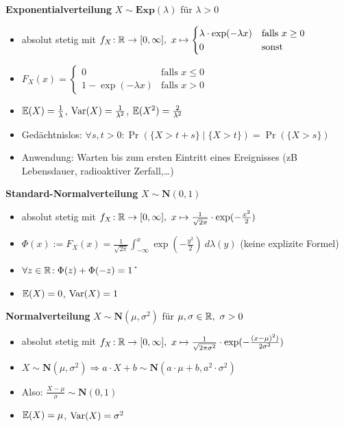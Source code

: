 \textbf{Exponentialverteilung} $X\sim\mathbf{Exp}(\lambda)$ für $\lambda > 0$
\begin{itemize}
\item absolut stetig mit
  $f_X\!: \mathbb{R} \to [0,\infty],\ x \mapsto \begin{cases}
  \lambda \cdot \exp(-\lambda x) & \text{falls } x \geq 0	\\
  0                              & \text{sonst }
  \end{cases}$

\item
  $F_X(x) = \begin{cases}
  0                    & \text{falls } x \leq 0  \\
  1 - \exp(-\lambda x) & \text{falls } x > 0
  \end{cases}$

\item $\mathbb{E}(X) = \frac{1}{\lambda}$, $\operatorname{Var}(X) = \frac{1}{\lambda^2}$,
  $\mathbb{E}(X^2) = \frac{2}{\lambda^2}$

\item Gedächtnislos: $\forall s,t>0\!: \Pr(\{X>t+s\} \mid \{X>t\}) = \Pr(\{X>s\})$

\item Anwendung: Warten bis zum ersten Eintritt eines Ereignisses
  (zB Lebensdauer, radioaktiver Zerfall,\ldots)
\end{itemize}

\textbf{Standard-Normalverteilung} $X\sim\mathbf{N}(0,1)$
\begin{itemize}
\item absolut stetig mit $f_X\!: \mathbb{R} \to [0,\infty],\
  x \mapsto \frac{1}{\sqrt{2\pi}} \cdot \exp(-\frac{x^2}{2})$

\item $\Phi(x) := F_X(x)=
  \frac{1}{\sqrt{2\pi}} \int_{-\infty}^{x} \exp(-\frac{y^2}{2})~d\lambda(y)$
  (keine explizite Formel)

\item $\forall z\in\mathbb{R}\!: \Phi(z) + \Phi(-z) = 1$ \U

\item $\mathbb{E}(X) = 0$, $\operatorname{Var}(X) = 1$

\end{itemize}

\textbf{Normalverteilung} $X\sim\mathbf{N}(\mu,\sigma^2)$ für
  $\mu,\sigma\in\mathbb{R},\ \sigma > 0$
\begin{itemize}
\item absolut stetig mit $f_X\!: \mathbb{R} \to [0,\infty],\
  x \mapsto \frac{1}{\sqrt{2\pi\sigma^2}} \cdot \exp(-\frac{(x-\mu)^2)}{2\sigma^2})$

\item $X\sim\mathbf{N}(\mu,\sigma^2)
  \Rightarrow a \cdot X + b \sim\mathbf{N}(a\cdot\mu+b,a^2\cdot\sigma^2)$

\item Also: $\frac{X-\mu}{\sigma} \sim \mathbf{N}(0,1)$

\item $\mathbb{E}(X) = \mu$, $\operatorname{Var}(X) = \sigma^2$
\end{itemize}

